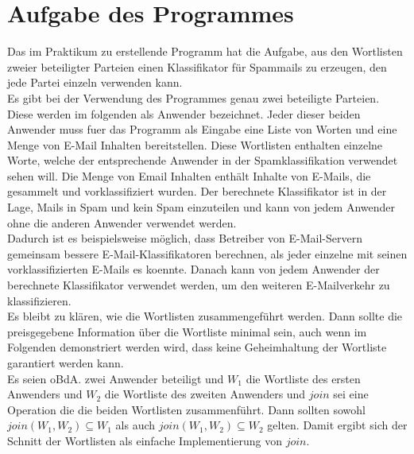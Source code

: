\documentclass{article}
\begin{document}
\section{Aufgabe des Programmes}
  Das im Praktikum zu erstellende Programm hat die Aufgabe, aus 
den Wortlisten zweier beteiligter Parteien einen Klassifikator 
f\"ur Spammails zu erzeugen, den jede Partei einzeln verwenden kann.\\
  Es gibt bei der Verwendung des Programmes genau zwei beteiligte Parteien.
Diese werden im folgenden als Anwender bezeichnet. Jeder dieser beiden
Anwender muss fuer das Programm als Eingabe eine Liste von Worten und eine
Menge von E-Mail Inhalten bereitstellen.
  Diese Wortlisten enthalten einzelne Worte, welche der entsprechende
Anwender in der Spamklassifikation verwendet sehen will.
  Die Menge von Email Inhalten enth\"alt Inhalte von E-Mails, die gesammelt
und vorklassifiziert wurden.
  Der berechnete Klassifikator ist in der Lage, Mails in Spam und kein Spam
einzuteilen und kann von jedem Anwender ohne die anderen Anwender verwendet
werden.\\
  Dadurch ist es beispielsweise m\"oglich, dass Betreiber von E-Mail-Servern
gemeinsam bessere E-Mail-Klassifikatoren berechnen, als jeder einzelne mit
seinen vorklassifizierten E-Mails es koennte. Danach kann von jedem
Anwender der berechnete Klassifikator verwendet werden, um den weiteren 
E-Mailverkehr zu klassifizieren.\\
  Es bleibt zu kl\"aren, wie die Wortlisten zusammengef\"uhrt werden. 
  Dann sollte die preisgegebene Information \"uber die Wortliste minimal
sein, auch wenn im Folgenden demonstriert werden wird, dass keine
Geheimhaltung der Wortliste garantiert werden kann.\\
  Es seien oBdA. zwei Anwender beteiligt und \(W_1\) die Wortliste des
ersten Anwenders und \(W_2\) die Wortliste des zweiten Anwenders und 
\(join\) sei eine Operation die die beiden Wortlisten zusammenf\"uhrt.
  Dann sollten sowohl \(join(W_1, W_2) \subseteq W_1\) als auch
\(join(W_1, W_2) \subseteq W_2\) gelten.
  Damit ergibt sich der Schnitt der Wortlisten als einfache Implementierung
von \(join\).
\end{document}
